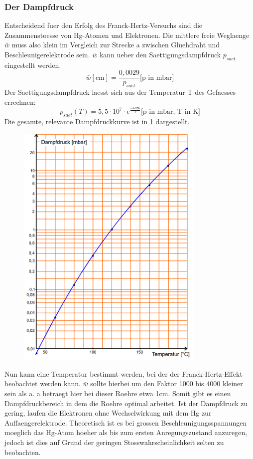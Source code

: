 \subsubsection{Der Dampfdruck}
Entscheidend fuer den Erfolg des Franck-Hertz-Versuchs sind die Zusammenstoesse von Hg-Atomen und Elektronen. Die mittlere freie Weglaenge $\bar{w}$ muss also klein im Vergleich zur Strecke a zwischen Gluehdraht und Beschleunigerelektrode sein. $\bar{w}$ kann ueber den Saettigungsdampfdruck $p_{saet}$ eingestellt werden.
\begin{equation}\label{w}
    \bar{w}[\text{cm}]=\frac{0,0029}{p_{saet}} \text{[p in mbar]}
\end{equation}
Der Saettigungsdampfdruck laesst sich aus der Temperatur T des Gefaesses errechnen:
\begin{equation} \label{ps}
    p_{saet}(T)=5,5\cdot10^7\cdot e^{\frac{-6876}{T}} \text{[p in mbar, T in K]}
\end{equation}
Die gesamte, relevante Dampfdruckkurve ist in \ref{Fig:Dampf} dargestellt.
\begin{figure}[H]
    \centering
    \captionsetup{justification=centering}
    \includegraphics[height=12cm]{"Dampf_FranckHertz.png"}
    \label{Fig:Dampf}
\end{figure}
\noindent Nun kann eine Temperatur bestimmt werden, bei der der Franck-Hertz-Effekt beobachtet werden kann. $\bar{w}$ sollte hierbei um den Faktor 1000 bis 4000 kleiner sein als a. a betraegt hier bei dieser Roehre etwa 1cm. Somit gibt es einen Dampfdruckbereich in dem die Roehre optimal arbeitet. Ist der Dampfdruck zu gering, laufen die Elektronen ohne Wechselwirkung mit dem Hg zur Auffaengerelektrode. Theoretisch ist es bei grossen Beschleunigungsspannungen moeglich das Hg-Atom hoeher als bis zum ersten Anregungszustand anzuregen, jedoch ist dies auf Grund der geringen Stosswahrscheinlichkeit selten zu beobachten.\\
